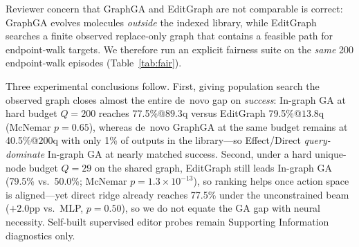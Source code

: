 Reviewer concern that GraphGA and EditGraph are not comparable is correct: GraphGA evolves molecules \emph{outside} the indexed library, while EditGraph searches a finite observed replace-only graph that contains a feasible path for endpoint-walk targets. We therefore run an explicit fairness suite on the \emph{same} 200 endpoint-walk episodes (Table~\ref{tab:fair}).

\begin{table}[t]
\caption{Fairness suite on 200 endpoint-walk episodes. \emph{In-graph GA} uses the same observed replace-only edges as EditGraph. \emph{GraphGA de~novo} uses official mol-opt operators and may leave the library. Effect/Direct queries use unique-node accounting (Table~\ref{tab:direct}); GA/GraphGA budgets are hard unique-node caps (not matched to Effect's mean). Self-built supervised editor rows are in the Supporting Information.}
\label{tab:fair}
\centering
\small
{}
\end{table}

Three experimental conclusions follow. First, giving population search the observed graph closes almost the entire de~novo gap on \emph{success}: In-graph GA at hard budget $Q{=}200$ reaches 77.5\%@$89.3$q versus EditGraph 79.5\%@$13.8$q (McNemar $p{=}0.65$), whereas de~novo GraphGA at the same budget remains at 40.5\%@$200$q with only 1\% of outputs in the library---so Effect/Direct \emph{query-dominate} In-graph GA at nearly matched success. Second, under a hard unique-node budget $Q{=}29$ on the shared graph, EditGraph still leads In-graph GA (79.5\% vs.\ 50.0\%; McNemar $p{=}1.3\times10^{-13}$), so ranking helps once action space is aligned---yet direct ridge already reaches 77.5\% under the unconstrained beam ($+2.0$pp vs.\ MLP, $p{=}0.50$), so we do not equate the GA gap with neural necessity. Self-built supervised editor probes remain Supporting Information diagnostics only.

